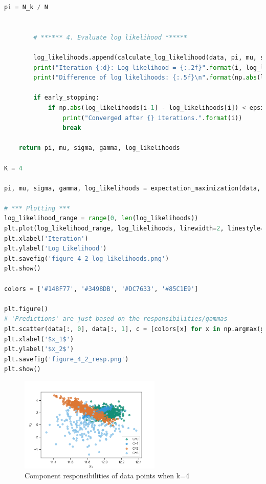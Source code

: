 \documentclass[a4paper]{article}
\begin{document}
\begin{lstlisting}[language=Python]
        pi = N_k / N
        
        
        # ****** 4. Evaluate log likelihood ****** 

        log_likelihoods.append(calculate_log_likelihood(data, pi, mu, sigma, K))
        print("Iteration {:d}: Log likelihood = {:.2f}".format(i, log_likelihoods[i]))
        print("Difference of log likelihoods: {:.5f}\n".format(np.abs(log_likelihoods[i-1] - log_likelihoods[i])))
        
        if early_stopping:
            if np.abs(log_likelihoods[i-1] - log_likelihoods[i]) < epsilon:
                print("Converged after {} iterations.".format(i))
                break   
    
    return pi, mu, sigma, gamma, log_likelihoods
    
K = 4    
    
pi, mu, sigma, gamma, log_likelihoods = expectation_maximization(data, K)

# *** Plotting ***
log_likelihood_range = range(0, len(log_likelihoods))
plt.plot(log_likelihood_range, log_likelihoods, linewidth=2, linestyle="-")
plt.xlabel('Iteration')
plt.ylabel('Log Likelihood')
plt.savefig('figure_4_2_log_likelihoods.png')
plt.show()
    
colors = ['#148F77', '#3498DB', '#DC7633', '#85C1E9']

plt.figure()
# 'Predictions' are just based on the responsibilities/gammas
plt.scatter(data[:, 0], data[:, 1], c = [colors[x] for x in np.argmax(gamma, 1)], alpha = 0.75)
plt.xlabel('$x_1$')
plt.ylabel('$x_2$')
plt.savefig('figure_4_2_resp.png')
plt.show()    
\end{lstlisting}



\begin{figure}[H]
\center
\includegraphics[width=0.6\textwidth]{Images/figure_4_2_resp.png}
\caption{Component responsibilities of data points when k=4}
\label{Fig:responsibilities}
\end{figure}
\end{document}
